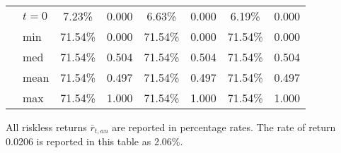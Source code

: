 \documentclass[letterpaper,12pt]{article}
\theoremstyle{definition}
\begin{document}
\begin{spacing}{1.5}
\begin{table}[htbp]
\begin{threeparttable}
\begin{tabular}{>{\small}c >{\small}l| >{\small}c >{\small}c| >{\small}c >{\small}c| >{\small}c >{\small}c}
      & $t=0$ & 7.23\% & 0.000 & 6.63\% & 0.000 & 6.19\% & 0.000 \\
      & min & 71.54\% & 0.000 & 71.54\% & 0.000 & 71.54\% & 0.000 \\
      & med & 71.54\% & 0.504 & 71.54\% & 0.504 & 71.54\% & 0.504 \\
      & mean & 71.54\% & 0.497 & 71.54\% & 0.497 & 71.54\% & 0.497 \\
      & max & 71.54\% & 1.000 & 71.54\% & 1.000 & 71.54\% & 1.000 \\
      \hline\hline
    \end{tabular}
    \begin{tablenotes}
      \scriptsize{\item[]All riskless returns $\bar{r}_{t,an}$ are reported in percentage rates. The rate of return 0.0206 is reported in this table as 2.06\%.}
    \end{tablenotes}
    \end{threeparttable}
  \end{table}


\end{spacing}
\end{document}
